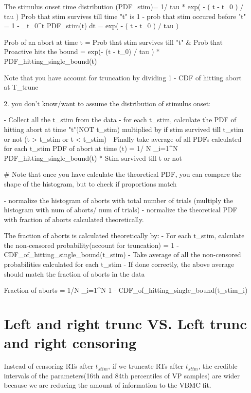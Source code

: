The stimulus onset time distribution (PDF_stim)= 1/ tau * exp( - ( t - t_0 ) / tau )
Prob that stim survives till time "t" is 1 - prob that stim occured before "t"
 =  1 - \int_{t_0}^{t} PDF_stim(t) dt = exp( - ( t - t_0 ) / tau )


 Prob of an abort at time t = Prob that stim survives till "t" & Prob that Proactive hits the bound
                             = exp(- (t - t_0) / tau ) * PDF_hitting_single_bound(t)


Note that you have account for truncation by dividing 1 - CDF of hitting abort at T_trunc

2. you don't know/want to assume the distribution of stimulus onset:

- Collect all the t_stim from the data
- for each t_stim, calculate the PDF of hitting abort at time "t"(NOT t_stim) multiplied by if stim survived till t_stim or not (t > t_stim or t < t_stim)
- Finally take average of all PDFs calculated for each t_stim
PDF of abort at time (t) = 1/ N \Sigma_{i=1}^{N} PDF_hitting_single_bound(t) * Stim survived till t or not 


# Note that once you have calculate the theoretical PDF, you can compare the shape of the histogram, 
but to check if proportions match

- normalize the histogram of aborts with total number of trials (multiply the histogram with num of aborts/ num of trials)
- normalize the theoretical PDF with fraction of aborts calculated theoretically. 

The fraction of aborts is calculated theoretically by:
- For each t_stim, calculate the non-censored probability(account for truncation) = 1 - CDF_of_hitting_single_bound(t_stim)
- Take average of all the non-censored probabilities calculated for each t_stim
- If done correctly, the above average should match the fraction of aborts in the data

Fraction of aborts = 1/N \Sigma_{i=1}^{N} 1 - CDF_of_hitting_single_bound(t_stim_i)   




\section{Left and right trunc VS. Left trunc and right censoring}
Instead of censoring RTs after $t_{stim}$, if we truncate RTs after $t_{stim}$, 
the credible intervals of the parameters(16th and 84th percentiles of VP samples) are wider because we are reducing the amount of 
information to the VBMC fit.

